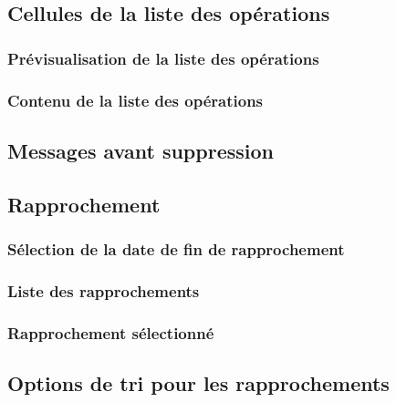 \subsection{Cellules de la liste des opérations\label{setup-operations-cells}}


\subsubsection{Prévisualisation de la liste des opérations\label{setup-operations-cells-display}}


\subsubsection{Contenu de la liste des opérations}


\subsection{Messages avant suppression\label{setup-operations-remove}}


\subsection{Rapprochement\label{setup-operations-reconciliation}}

\subsubsection{Sélection de la date de fin de rapprochement\label{setup-operations-reconciliation-date}}

\subsubsection{Liste des rapprochements}


\subsubsection{Rapprochement sélectionné}


\subsection{Options de tri pour les rapprochements\label{setup-operations-sort}}


